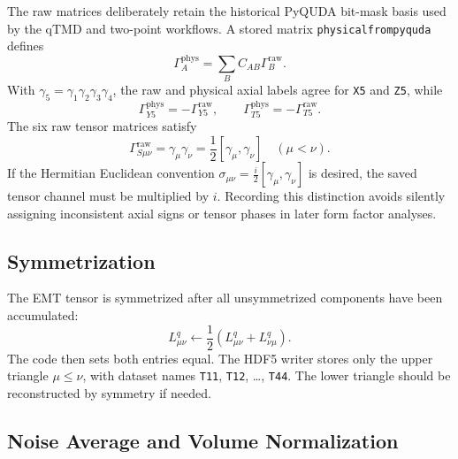 \documentclass[11pt,a4paper]{article}
\newcommand{\code}[1]{\texttt{\begingroup\def\_{\textunderscore\allowbreak}#1\endgroup}}
\begin{document}
The raw matrices deliberately retain the historical PyQUDA bit-mask basis used
by the qTMD and two-point workflows.  A stored matrix
\code{physical\_from\_pyquda} defines
\begin{equation}
  \Gamma_A^{\mathrm{phys}}
  =\sum_B C_{AB}\Gamma_B^{\mathrm{raw}}.
\end{equation}
With \(\gamma_5=\gamma_1\gamma_2\gamma_3\gamma_4\), the raw and physical axial
labels agree for \code{X5} and \code{Z5}, while
\begin{equation}
  \Gamma_{Y5}^{\mathrm{phys}}=-\Gamma_{Y5}^{\mathrm{raw}},\qquad
  \Gamma_{T5}^{\mathrm{phys}}=-\Gamma_{T5}^{\mathrm{raw}}.
\end{equation}
The six raw tensor matrices satisfy
\begin{equation}
  \Gamma_{S\mu\nu}^{\mathrm{raw}}
  =\gamma_\mu\gamma_\nu
  =\frac12[\gamma_\mu,\gamma_\nu]
  \quad (\mu<\nu).
\end{equation}
If the Hermitian Euclidean convention
\(\sigma_{\mu\nu}=\frac{i}{2}[\gamma_\mu,\gamma_\nu]\) is desired, the saved
tensor channel must be multiplied by \(i\).  Recording this distinction avoids
silently assigning inconsistent axial signs or tensor phases in later form
factor analyses.

\subsection{Symmetrization}

The EMT tensor is symmetrized after all unsymmetrized components have been
accumulated:
\begin{equation}
  L^q_{\mu\nu}
  \leftarrow
  \frac{1}{2}\left(L^q_{\mu\nu} + L^q_{\nu\mu}\right).
  \label{eq:quark_sym}
\end{equation}
The code then sets both entries equal.  The HDF5 writer stores only the upper
triangle \(\mu\leq\nu\), with dataset names \code{T11}, \code{T12}, \ldots,
\code{T44}.  The lower triangle should be reconstructed by symmetry if needed.

\subsection{Noise Average and Volume Normalization}
\end{document}
